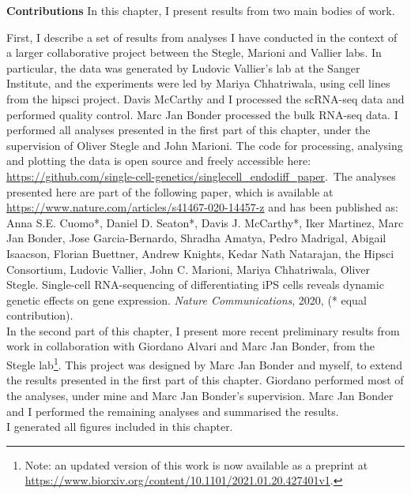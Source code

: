 \newpage

\begin{Comment2}
\hspace{-3mm}\textbf{Contributions} 
In this chapter, I present results from two main bodies of work.

First, I describe a set of results from analyses I have conducted in the context of a larger collaborative project between the Stegle, Marioni and Vallier labs. 
In particular, the data was generated by Ludovic Vallier’s lab at the Sanger Institute, and the experiments were led by Mariya Chhatriwala, using cell lines from the \gls{hipsci} project.
Davis McCarthy and I processed the scRNA-seq data and performed quality control.
Marc Jan Bonder processed the bulk RNA-seq data.
I performed all analyses presented in the first part of this chapter, under the supervision of Oliver Stegle and John Marioni.
The code for processing, analysing and plotting the data is open source and freely accessible here: \url{https://github.com/single-cell-genetics/singlecell\_endodiff\_paper}.\
The analyses presented here are part of the following paper, which is available at \url{https://www.nature.com/articles/s41467-020-14457-z} and has been published as:\\

Anna S.E. Cuomo*, Daniel D. Seaton*, Davis J. McCarthy*, Iker Martinez, Marc Jan Bonder, Jose Garcia-Bernardo, Shradha Amatya, Pedro Madrigal, Abigail Isaacson, Florian Buettner, Andrew Knights, Kedar Nath Natarajan, the Hipsci Consortium, Ludovic Vallier, John C. Marioni, Mariya Chhatriwala, Oliver Stegle. Single-cell RNA-sequencing of differentiating iPS cells reveals dynamic genetic effects on gene expression. \textit{Nature Communications}, 2020, (* equal contribution).\\


In the second part of this chapter, I present more recent preliminary results from work in collaboration with Giordano Alvari and Marc Jan Bonder, from the Stegle lab\footnote{Note: an updated version of this work is now available as a preprint at \url{https://www.biorxiv.org/content/10.1101/2021.01.20.427401v1}.}.
This project was designed by Marc Jan Bonder and myself, to extend the results presented in the first part of this chapter.
Giordano performed most of the analyses, under mine and Marc Jan Bonder's supervision.
Marc Jan Bonder and I performed the remaining analyses and summarised the results.\\

I generated all figures included in this chapter. \\
\end{Comment2}

